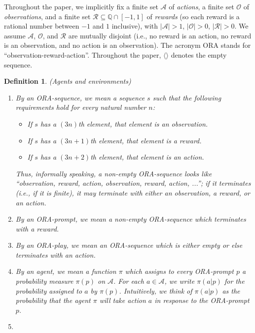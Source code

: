 \documentclass{article}
\newtheorem{definition}[theorem]{Definition}
\begin{document}
Throughout the paper, we implicitly
fix a finite set $\mathcal A$ of \emph{actions},
a finite set $\mathcal O$ of \emph{observations},
and a finite set $\mathcal R\subseteq \mathbb Q\cap [-1,1]$ of \emph{rewards}
(so each reward is a rational number between $-1$ and $1$ inclusive),
with $|\mathcal A|>1$,
$|\mathcal O|>0$, $|\mathcal R|>0$.
We assume $\mathcal A$, $\mathcal O$, and $\mathcal R$ are mutually disjoint
(i.e., no reward is an action, no reward is an observation, and no action is an
observation).
The acronym ORA stands for ``observation-reward-action''.
Throughout the paper, $\langle\rangle$ denotes the empty sequence.

\begin{definition}
    (Agents and environments)
    \begin{enumerate}
        \item
        By an \emph{ORA-sequence}, we mean a sequence $s$ such that the following requirements
        hold for every natural number $n$:
        \begin{itemize}
            \item If $s$ has a $(3n)$th element, that element is an observation.
            \item If $s$ has a $(3n+1)$th element, that element is a reward.
            \item If $s$ has a $(3n+2)$th element, that element is an action.
        \end{itemize}
        Thus, informally speaking, a non-empty ORA-sequence
        looks like ``observation, reward, action, observation, reward, action, ...'';
        if it terminates (i.e., if it is finite), it may terminate with
        either an observation, a reward, or an action.
        \item
        By an \emph{ORA-prompt}, we mean a non-empty ORA-sequence which
        terminates with a reward.
        \item
        By an \emph{ORA-play}, we mean an ORA-sequence which is either empty or else
        terminates with an action.
        \item
        By an \emph{agent}, we mean a function $\pi$ which assigns to every
        ORA-prompt $p$ a probability measure $\pi(p)$ on $\mathcal A$.
        For each $a\in\mathcal A$,
        we write $\pi(a|p)$ for the probability assigned to $a$ by $\pi(p)$.
        Intuitively, we think of $\pi(a|p)$ as the probability that the agent $\pi$
        will take action $a$ in response to the ORA-prompt $p$.
        \item

\end{enumerate}
\end{definition}
\end{document}
